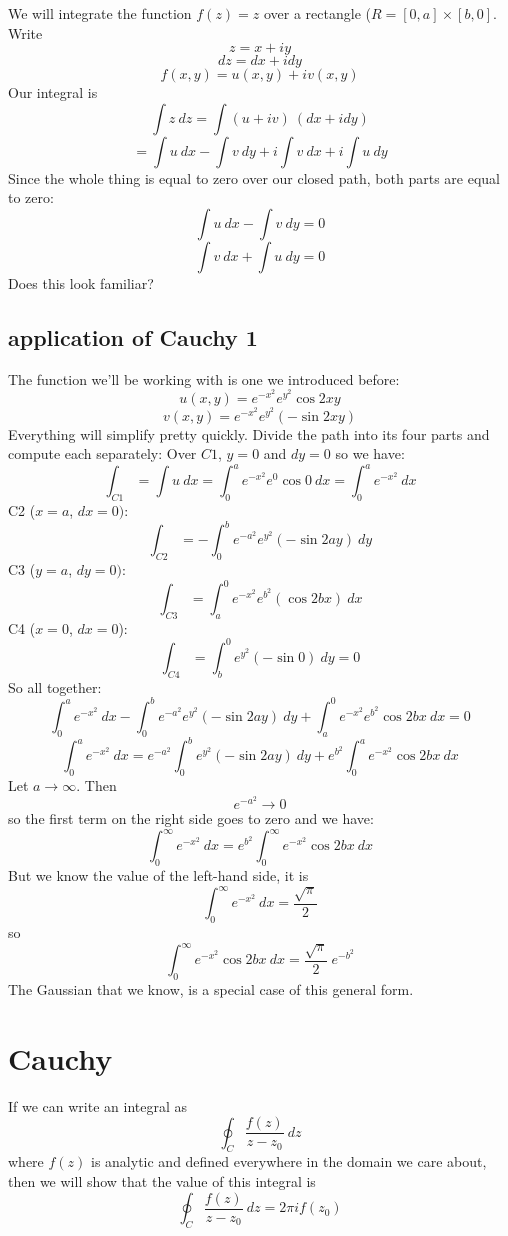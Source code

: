 \documentclass[11pt, oneside]{article}   	%
\begin{document}
We will integrate the function $f(z) = z$ over a rectangle ($R = [0,a] \times [b,0]$.  Write
\[ z = x + i y \]
\[ dz = dx + i dy \]
\[ f(x,y) = u(x,y) + iv(x,y) \]
Our integral is
\[ \int z \ dz = \int (u + iv) \ (dx + i dy) \]
\[ = \int u \ dx - \int v \ dy + i \int v \ dx + i \int u \ dy \]
Since the whole thing is equal to zero over our closed path, both parts are equal to zero:
\[ \int u \ dx - \int v \ dy = 0 \]
\[ \int v \ dx + \int u \ dy = 0 \]
Does this look familiar?

\subsection*{application of Cauchy 1}

The function we'll be working with is one we introduced before:
\[ u(x,y) =  e^{-x^2} e^{y^2} \cos 2xy \]
\[ v(x,y) = e^{-x^2} e^{y^2} (- \sin 2xy) \]
Everything will simplify pretty quickly.  Divide the path into its four parts and compute each separately:
Over $C1$, $y=0$ and $dy = 0$ so we have:
\[ \int_{C1} = \int u \ dx = \int_0^a e^{-x^2} e^{0} \cos 0 \ dx = \int_0^a e^{-x^2} \ dx \]
C2 ($x = a$, $dx = 0)$:
\[ \int_{C2} = - \int_0^b e^{-a^2} e^{y^2} (- \sin 2ay) \ dy  \]
C3 ($y = a$, $dy = 0)$:
\[ \int_{C3} = \int_a^0 e^{-x^2} e^{b^2} (\cos 2bx) \ dx  \]
C4 ($x = 0$, $dx = 0$):
\[ \int_{C4} = \int_b^0 e^{y^2} (-\sin 0) \ dy = 0 \]
So all together:
\[ \int_0^a e^{-x^2} \ dx - \int_0^b e^{-a^2} e^{y^2} (- \sin 2ay) \ dy + \int_a^0 e^{-x^2} e^{b^2} \cos 2bx \ dx = 0 \]
\[ \int_0^a e^{-x^2} \ dx = e^{-a^2} \int_0^b e^{y^2} (- \sin 2ay) \ dy + e^{b^2} \int_0^a e^{-x^2} \cos 2bx \ dx  \]
Let $a \rightarrow \infty$.  Then
\[ e^{-a^2} \rightarrow 0 \]
so the first term on the right side goes to zero and we have:
\[ \int_0^{\infty} e^{-x^2} \ dx = e^{b^2} \int_0^{\infty} e^{-x^2} \cos 2bx \ dx  \]
But we know the value of the left-hand side, it is 
\[ \int_0^{\infty} e^{-x^2} \ dx = \frac{\sqrt{\pi}}{2} \]
so
\[  \int_0^{\infty} e^{-x^2} \cos 2bx \ dx = \frac{\sqrt{\pi}}{2} \ e^{-b^2} \]
The Gaussian that we know, is a special case of this general form.

\section{Cauchy}
If we can write an integral as
\[ \oint_{C} \frac{f(z)}{z-z_0} \ dz \]
where $f(z)$ is analytic and defined everywhere in the domain we care about, then we will show that the value of this integral is 
\[ \oint_C \frac{f(z)}{z-z_0} \ dz = 2 \pi i f(z_0) \]
\end{document}
